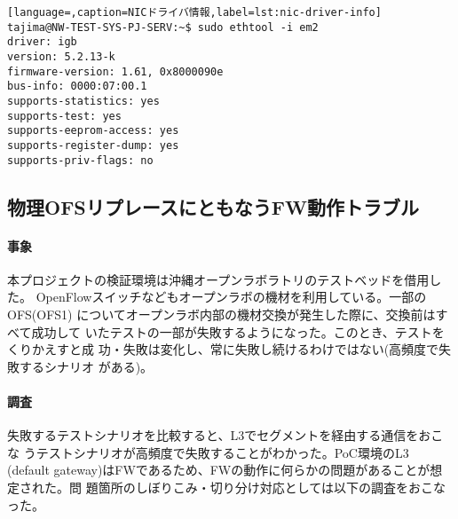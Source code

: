 \begin{lstlisting}[language=,caption=NICドライバ情報,label=lst:nic-driver-info]
tajima@NW-TEST-SYS-PJ-SERV:~$ sudo ethtool -i em2
driver: igb
version: 5.2.13-k
firmware-version: 1.61, 0x8000090e
bus-info: 0000:07:00.1
supports-statistics: yes
supports-test: yes
supports-eeprom-access: yes
supports-register-dump: yes
supports-priv-flags: no
\end{lstlisting}

 \subsection{物理OFSリプレースにともなうFW動作トラブル}
 \label{sec:ofs-replace-fw-trouble}

    \paragraph{事象}
本プロジェクトの検証環境は沖縄オープンラボラトリのテストベッドを借用した。
OpenFlowスイッチなどもオープンラボの機材を利用している。一部のOFS(OFS1)
についてオープンラボ内部の機材交換が発生した際に、交換前はすべて成功して
いたテストの一部が失敗するようになった。このとき、テストをくりかえすと成
功・失敗は変化し、常に失敗し続けるわけではない(高頻度で失敗するシナリオ
がある)。

    \paragraph{調査}
失敗するテストシナリオを比較すると、L3でセグメントを経由する通信をおこな
うテストシナリオが高頻度で失敗することがわかった。PoC環境のL3 (default
gateway)はFWであるため、FWの動作に何らかの問題があることが想定された。問
題箇所のしぼりこみ・切り分け対応としては以下の調査をおこなった。

